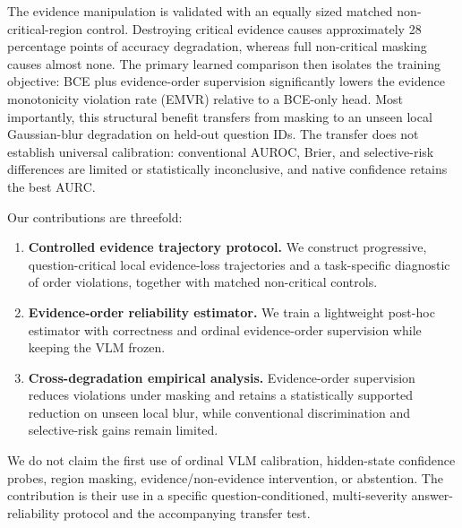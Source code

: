 The evidence manipulation is validated with an equally sized matched non-critical-region control. Destroying critical evidence causes approximately 28 percentage points of accuracy degradation, whereas full non-critical masking causes almost none. The primary learned comparison then isolates the training objective: BCE plus evidence-order supervision significantly lowers the evidence monotonicity violation rate (EMVR) relative to a BCE-only head. Most importantly, this structural benefit transfers from masking to an unseen local Gaussian-blur degradation on held-out question IDs. The transfer does not establish universal calibration: conventional AUROC, Brier, and selective-risk differences are limited or statistically inconclusive, and native confidence retains the best AURC.

Our contributions are threefold:
\begin{enumerate}
    \item \textbf{Controlled evidence trajectory protocol.} We construct progressive, question-critical local evidence-loss trajectories and a task-specific diagnostic of order violations, together with matched non-critical controls.
    \item \textbf{Evidence-order reliability estimator.} We train a lightweight post-hoc estimator with correctness and ordinal evidence-order supervision while keeping the VLM frozen.
    \item \textbf{Cross-degradation empirical analysis.} Evidence-order supervision reduces violations under masking and retains a statistically supported reduction on unseen local blur, while conventional discrimination and selective-risk gains remain limited.
\end{enumerate}

We do not claim the first use of ordinal VLM calibration, hidden-state confidence probes, region masking, evidence/non-evidence intervention, or abstention. The contribution is their use in a specific question-conditioned, multi-severity answer-reliability protocol and the accompanying transfer test.

